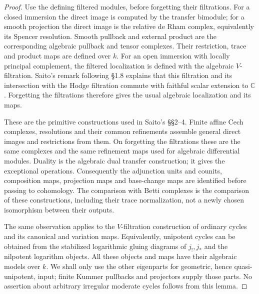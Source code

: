 \documentclass[11pt]{article}
\numberwithin{equation}{section}
\theoremstyle{definition}
\theoremstyle{remark}
\newcommand{\C}{\mathbb C}
\begin{document}
\begin{proof}
Use the defining filtered modules, before forgetting their filtrations.
For a closed immersion the direct image is computed by the transfer
bimodule; for a smooth projection the direct image is the relative de
Rham complex, equivalently its Spencer resolution. Smooth pullback and
external product are the corresponding algebraic pullback and tensor
complexes. Their restriction, trace and product maps are defined over
$k$. For an open immersion with locally principal complement, the
filtered localization is defined with the algebraic $V$-filtration.
Saito's remark following \S1.8 explains that this filtration and its
intersection with the Hodge filtration commute with faithful scalar
extension to $\C$. Forgetting the filtrations therefore gives the usual
algebraic localization and its maps.

These are the primitive constructions used in Saito's \S\S2--4.
Finite affine Cech complexes, resolutions and their common refinements
assemble general direct images and restrictions from them. On forgetting
the filtrations these are the same complexes and the same refinement
maps used for algebraic differential modules. Duality is the algebraic
dual transfer construction; it gives the exceptional operations.
Consequently the adjunction units and counits, composition maps,
projection maps and base-change maps are identified before passing to
cohomology. The comparison with Betti complexes is the comparison of
these constructions, including their trace normalization, not a newly
chosen isomorphism between their outputs.

The same observation applies to the $V$-filtration construction of
ordinary cycles and its canonical and variation maps. Equivalently,
unipotent cycles can be obtained from the stabilized logarithmic gluing
diagrams of $j_!,j_*$ and the nilpotent logarithm objects. All these
objects and maps have their algebraic models over $k$. We shall only
use the other eigenparts for geometric, hence quasi-unipotent, input;
finite Kummer pullbacks and projectors supply those parts. No assertion
about arbitrary irregular moderate cycles follows from this lemma.
\end{proof}
\end{document}
